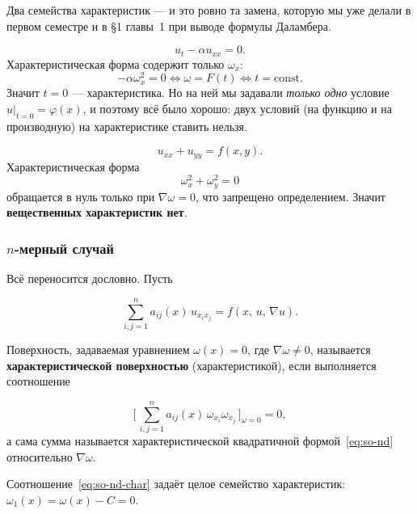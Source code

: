 \begin{remark}
Два семейства характеристик — и это ровно та замена, которую мы уже делали в
первом семестре и в \S1 главы~1 при выводе формулы Даламбера.
\end{remark}

\begin{example}
\[
  u_t - \alpha u_{xx} = 0 .
\]
Характеристическая форма содержит только $\omega_x$:
\[
  -\alpha \omega_x^2 = 0
  \iff \omega = F(t)
  \iff t = \mathrm{const} .
\]
Значит $t = 0$ — характеристика. Но на ней мы задавали \emph{только одно}
условие $u|_{t=0} = \varphi(x)$, и поэтому всё было хорошо: двух условий (на
функцию и на производную) на характеристике ставить нельзя.
\end{example}

\begin{example}
\[
  u_{xx} + u_{yy} = f(x,y) .
\]
Характеристическая форма
\[
  \omega_x^2 + \omega_y^2 = 0
\]
обращается в нуль только при $\nabla\omega = 0$, что запрещено определением.
Значит \textbf{вещественных характеристик нет}.
\end{example}

\subsubsection*{$n$-мерный случай}

Всё переносится дословно. Пусть

\begin{equation}\tag{4}\label{eq:so-nd}
  \sum_{i,j=1}^{n} a_{ij}(x)\, u_{x_i x_j} = f(x,\,u,\,\nabla u) .
\end{equation}

\begin{definition}
Поверхность, задаваемая уравнением $\omega(x) = 0$, где $\nabla\omega \ne 0$,
называется \textbf{характеристической поверхностью} (характеристикой), если
выполняется соотношение

\begin{equation}\tag{5}\label{eq:so-nd-char}
  \Bigg[\, \sum_{i,j=1}^{n} a_{ij}(x)\, \omega_{x_i} \omega_{x_j} \,\Bigg]_{\omega = 0}
  = 0 ,
\end{equation}
а сама сумма называется характеристической квадратичной
формой~\eqref{eq:so-nd} относительно $\nabla\omega$.
\end{definition}

\begin{remark}[замечание 1]
Соотношение~\eqref{eq:so-nd-char} задаёт целое семейство характеристик:
$\omega_1(x) = \omega(x) - C = 0$.
\end{remark}

